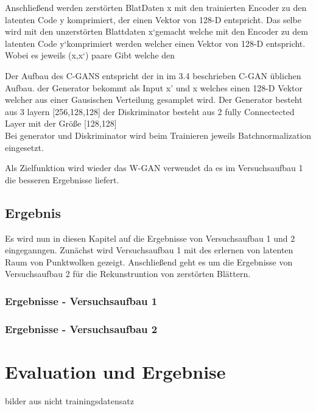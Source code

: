 \documentclass{llncs}
\begin{document}
Anschließend werden zerstörten BlatDaten x mit den trainierten Encoder zu den latenten Code y komprimiert, der einen Vektor von 128-D entspricht.
Das selbe wird mit den unzerstörten Blattdaten x`gemacht welche mit den Encoder zu dem latenten Code y`komprimiert werden welcher einen Vektor von 128-D entspricht. Wobei es jeweils (x,x`) paare Gibt welche den 

Der Aufbau des C-GANS entspricht der in im 3.4 beschrieben C-GAN üblichen Aufbau. der Generator bekommt als Input x' und x welches einen 128-D Vektor welcher aus einer Gausischen Verteilung gesamplet wird. Der Generator besteht aus 3 layern [256,128,128] der Diskriminator besteht aus 2 fully Connectected Layer mit der Größe [128,128]\\ Bei generator und Diskriminator wird beim Trainieren jeweils Batchnormalization eingesetzt. 

Als Zielfunktion wird wieder das W-GAN verwendet da es im Versuchsaufbau 1 die besseren Ergebnisse liefert. 






\subsection{Ergebnis}

Es wird nun in diesen Kapitel auf die Ergebnisse von Versuchsaufbau 1 und 2 eingeganngen. Zunächst wird Versuchsaufbau 1 mit des erlernen von latenten Raum von Punktwolken gezeigt. Anschließend geht es um die Ergebnisse von Versuchsaufbau 2 für die Rekunstruntion von zerstörten Blättern. 

\subsubsection{Ergebnisse - Versuchsaufbau 1}
\subsubsection{Ergebnisse - Versuchsaufbau 2}



\section{Evaluation und Ergebnise}
bilder aus nicht trainingsdatensatz
\end{document}
